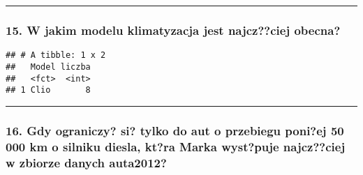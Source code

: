 \documentclass[]{article}
\newenvironment{Shaded}{\begin{snugshade}}{\end{snugshade}}
\newcommand{\KeywordTok}[1]{\textcolor[rgb]{0.13,0.29,0.53}{\textbf{#1}}}
\newcommand{\DataTypeTok}[1]{\textcolor[rgb]{0.13,0.29,0.53}{#1}}
\newcommand{\DecValTok}[1]{\textcolor[rgb]{0.00,0.00,0.81}{#1}}
\newcommand{\StringTok}[1]{\textcolor[rgb]{0.31,0.60,0.02}{#1}}
\newcommand{\OperatorTok}[1]{\textcolor[rgb]{0.81,0.36,0.00}{\textbf{#1}}}
\newcommand{\NormalTok}[1]{#1}
\begin{document}
\begin{center}\rule{0.5\linewidth}{\linethickness}\end{center}

\subsubsection{15. W jakim modelu klimatyzacja jest najcz??ciej
obecna?}\label{w-jakim-modelu-klimatyzacja-jest-najczciej-obecna}

\begin{Shaded}
\end{Shaded}

\begin{verbatim}
## # A tibble: 1 x 2
##   Model liczba
##   <fct>  <int>
## 1 Clio       8
\end{verbatim}

\begin{center}\rule{0.5\linewidth}{\linethickness}\end{center}

\subsubsection{16. Gdy ograniczy? si? tylko do aut o przebiegu poni?ej
50 000 km o silniku diesla, kt?ra Marka wyst?puje najcz??ciej w zbiorze
danych
auta2012?}\label{gdy-ograniczy-si-tylko-do-aut-o-przebiegu-poniej-50-000-km-o-silniku-diesla-ktra-marka-wystpuje-najczciej-w-zbiorze-danych-auta2012}

\begin{Shaded}
\end{Shaded}
\end{document}
